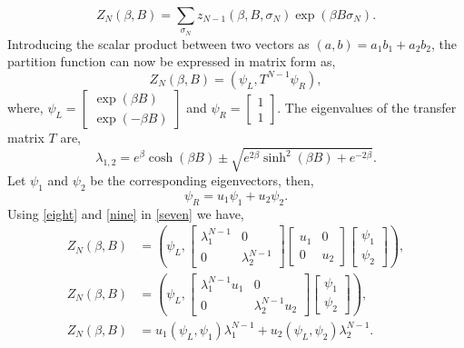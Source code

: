 \documentclass[letterpaper,english,10pt]{article}
\begin{document}
$$Z_{N}(\beta,B)=\sum_{\sigma_{N}}z_{N-1}(\beta,B,\sigma_{N})\exp(\beta B\sigma_{N}).$$
Introducing the scalar product between two vectors as $(a,b) = a_{1}b_{1}+a_{2}b_{2}$, the partition function can now be expressed in matrix form as,
\begin{equation}
Z_{N}(\beta,B) = (\psi_{L},T^{N-1}\psi_{R}),
\label{seven}
\end{equation}
where, $\psi_{L} = \begin{bmatrix}  \exp(\beta B)\\ \exp(-\beta B)\end{bmatrix}$ and $\psi_{R} = \begin{bmatrix} 1\\ 1\end{bmatrix}$. The eigenvalues of the transfer matrix $T$ are,
\begin{equation}
\lambda_{1,2} = e^{\beta}\cosh(\beta B)\pm \sqrt{e^{2\beta} \sinh^{2}(\beta B) + e^{-2\beta}}.
\label{eight}
 \end{equation}
Let $\psi_{1}$ and $\psi_{2}$ be the corresponding eigenvectors, then, 
 \begin{equation}
\psi_{R} = u_{1}\psi_{1}+u_{2}\psi_{2}.
\label{nine}
 \end{equation}
 Using \eqref{eight} and \eqref{nine} in \eqref{seven} we have,
 \begin{align}
Z_{N}(\beta,B) &= \left(\psi_{L}, 
\begin{bmatrix}
	\lambda_{1}^{N-1} & 0 \\
	0 & \lambda_{2}^{N-1} 
	\end{bmatrix}\begin{bmatrix}
	u_{1} & 0 \\
	0 & u_{2} 
	\end{bmatrix}\begin{bmatrix} \psi_{1}\\ \psi_{2}\end{bmatrix} \right),\nonumber\\
Z_{N}(\beta,B) &= \left(\psi_{L}, 
\begin{bmatrix}
	\lambda_{1}^{N-1}u_{1} & 0 \\
	0 & \lambda_{2}^{N-1}u_{2} 
	\end{bmatrix}\begin{bmatrix} \psi_{1}\\ \psi_{2}\end{bmatrix} \right),\nonumber\\
Z_{N}(\beta,B) &= u_{1}(\psi_{L},\psi_{1})\lambda_{1}^{N-1}+u_{2}(\psi_{L},\psi_{2})\lambda_{2}^{N-1}.
\label{ten}
\end{align}
\end{document}
